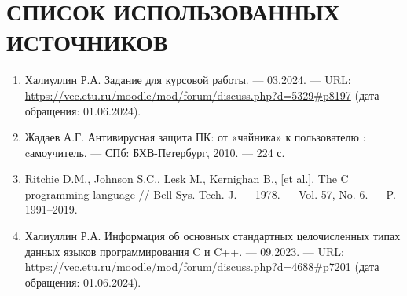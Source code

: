 
\chapter*{
	СПИСОК ИСПОЛЬЗОВАННЫХ ИСТОЧНИКОВ
}
\label{ch:bibla}
{
	
	\begin{enumerate} [label=\arabic*]
		\item \label{s:1} Халиуллин Р.А. Задание для курсовой работы. — 03.2024. — URL: \url{https://vec.etu.ru/moodle/mod/forum/discuss.php?d=5329#p8197} (дата обращения: 01.06.2024).
		\item \label{s:2} Жадаев А.Г. Антивирусная защита ПК: от «чайника» к пользователю : cамоучитель. — СПб: БХВ-Петербург, 2010. — 224 с.
		\item \label{s:3} Ritchie D.M., Johnson S.C., Lesk M., Kernighan B., [et al.]. The C programming language // Bell Sys. Tech. J. — 1978. — Vol. 57, No. 6. — P. 1991–2019.
		\item \label{s:4} Халиуллин Р.А. Информация об основных стандартных целочисленных типах данных языков программирования C и C++. — 09.2023. — URL: \url{https://vec.etu.ru/moodle/mod/forum/discuss.php?d=4688#p7201} (дата обращения: 01.06.2024).    
	\end{enumerate}
}

\endinput
